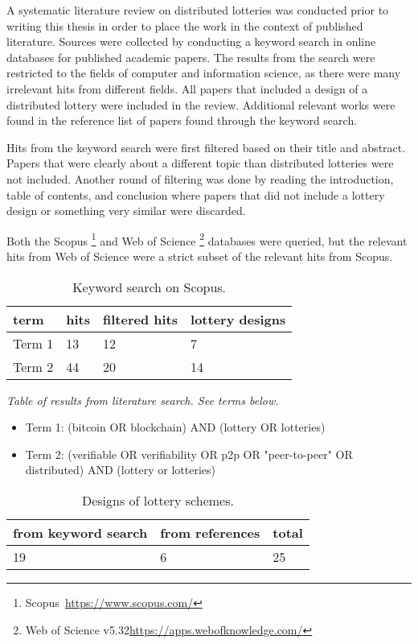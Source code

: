 A systematic literature review on distributed lotteries was conducted prior to writing this thesis in order to place the work in the context of published literature. Sources were collected by conducting a keyword search in online databases for published academic papers. The results from the search were restricted to the fields of computer and information science, as there were many irrelevant hits from different fields. All papers that included a design of a distributed lottery were included in the review. Additional relevant works were found in the reference list of papers found through the keyword search. 

Hits from the keyword search were first filtered based on their title and abstract. Papers that were clearly about a different topic than distributed lotteries were not included. Another round of filtering was done by reading the introduction, table of contents, and conclusion where papers that did not include a lottery design or something very similar were discarded. 

Both the Scopus \footnote{Scopus~\url{https://www.scopus.com/}} and Web of Science \footnote{Web of Science v5.32\url{https://apps.webofknowledge.com/}} databases were queried, but the relevant hits from Web of Science were a strict subset of the relevant hits from Scopus.

\begin{table}[h]
\centering
\caption{Keyword search on Scopus.}
\begin{tabular}{|l|l|l|l|}
\hline

term & hits & filtered hits & lottery designs \\ \hline
Term 1 & 13 & 12 & 7 \\ \hline
Term 2 & 44 & 20 & 14 \\ \hline

\end{tabular}
\end{table}
\emph{Table of results from literature search. See terms below.}

\begin{itemize}
    \item Term 1: (bitcoin OR blockchain) AND (lottery OR lotteries) 
    \item Term 2: (verifiable OR verifiability OR p2p OR "peer-to-peer" OR distributed) AND (lottery or lotteries)
\end{itemize}

\begin{table}[h]
\centering
\caption{Designs of lottery schemes.}
\begin{tabular}{|l|l|l|}
\hline

from keyword search & from references & total \\ \hline
19 & 6 & 25 \\ \hline

\end{tabular}
\end{table}

